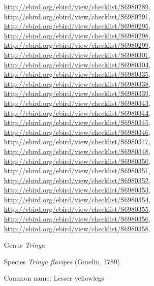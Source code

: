 \documentclass[9pt, article]{memoir}
\begin{document}
\begin{multicols}{2}
\url{http://ebird.org/ebird/view/checklist/S6980289}, 
\url{http://ebird.org/ebird/view/checklist/S6980291}, 
\url{http://ebird.org/ebird/view/checklist/S6980295}, 
\url{http://ebird.org/ebird/view/checklist/S6980298}, 
\url{http://ebird.org/ebird/view/checklist/S6980299}, 
\url{http://ebird.org/ebird/view/checklist/S6980301}, 
\url{http://ebird.org/ebird/view/checklist/S6980304}, 
\url{http://ebird.org/ebird/view/checklist/S6980335}, 
\url{http://ebird.org/ebird/view/checklist/S6980338}, 
\url{http://ebird.org/ebird/view/checklist/S6980339}, 
\url{http://ebird.org/ebird/view/checklist/S6980343}, 
\url{http://ebird.org/ebird/view/checklist/S6980344}, 
\url{http://ebird.org/ebird/view/checklist/S6980345}, 
\url{http://ebird.org/ebird/view/checklist/S6980346}, 
\url{http://ebird.org/ebird/view/checklist/S6980347}, 
\url{http://ebird.org/ebird/view/checklist/S6980348}, 
\url{http://ebird.org/ebird/view/checklist/S6980350}, 
\url{http://ebird.org/ebird/view/checklist/S6980351}, 
\url{http://ebird.org/ebird/view/checklist/S6980352}, 
\url{http://ebird.org/ebird/view/checklist/S6980353}, 
\url{http://ebird.org/ebird/view/checklist/S6980354}, 
\url{http://ebird.org/ebird/view/checklist/S6980355}, 
\url{http://ebird.org/ebird/view/checklist/S6980356}, 
\url{http://ebird.org/ebird/view/checklist/S6980358}.

\vspace{6pt}\noindent\hspace{30pt}Genus \textit{Tringa}


\vspace{6pt}\noindent\hspace{36pt}Species \textit{Tringa flavipes} (Gmelin, 1789)


Common name: Lesser yellowlegs


\end{multicols}
\end{document}

